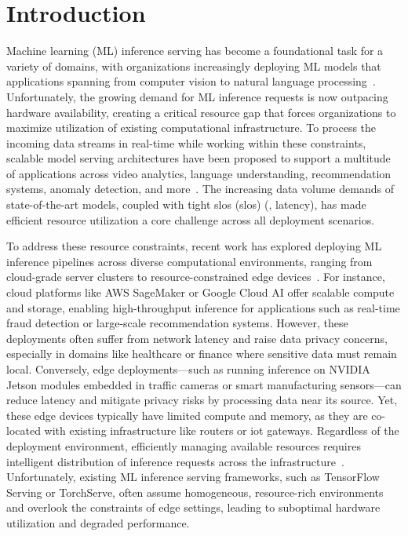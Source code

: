 \section{Introduction}\label{sec:intro}

Machine learning (ML) inference serving has become a foundational task for a variety of domains, with organizations  increasingly deploying ML models that applications spanning from computer vision to natural language processing~\cite{}. Unfortunately, the growing demand for ML inference requests is now outpacing hardware availability, creating a critical resource gap that forces organizations to maximize utilization of existing computational infrastructure. To process the incoming data streams in real-time while working within these constraints, scalable model serving architectures have been proposed to support a multitude of applications across video analytics, language understanding, recommendation systems, anomaly detection, and more~\cite{ahmad2024proteus,olston2017tensorflowserving,shubha2024usher,francisco2021infaas,mendoza2021interference}. The increasing data volume demands of state-of-the-art models, coupled with tight \acrlong{slo}s (\acrshort{slo}s) (\eg, latency), has made efficient resource utilization a core challenge across all deployment scenarios.

To address these resource constraints, recent work has explored deploying ML inference pipelines across diverse computational environments, ranging from cloud-grade server clusters to resource-constrained edge devices~\cite{mendoza2021interference,hu2021scrooge,ahmad2024proteus,shubha2024usher,cui2021Abacus,2017clipper}. For instance, cloud platforms like AWS SageMaker or Google Cloud AI offer scalable compute and storage, enabling high-throughput inference for applications such as real-time fraud detection or large-scale recommendation systems. However, these deployments often suffer from network latency and raise data privacy concerns, especially in domains like healthcare or finance where sensitive data must remain local. Conversely, edge deployments—such as running inference on NVIDIA Jetson modules embedded in traffic cameras or smart manufacturing sensors—can reduce latency and mitigate privacy risks by processing data near its source. Yet, these edge devices typically have limited compute and memory, as they are co-located with existing infrastructure like routers or \acrshort{iot} gateways. Regardless of the deployment environment, efficiently managing available resources requires intelligent distribution of inference requests across the infrastructure~\cite{olston2017tensorflowserving,francisco2021infaas}. Unfortunately, existing ML inference serving frameworks, such as TensorFlow Serving or TorchServe, often assume homogeneous, resource-rich environments and overlook the constraints of edge settings, leading to suboptimal hardware utilization and degraded performance.

